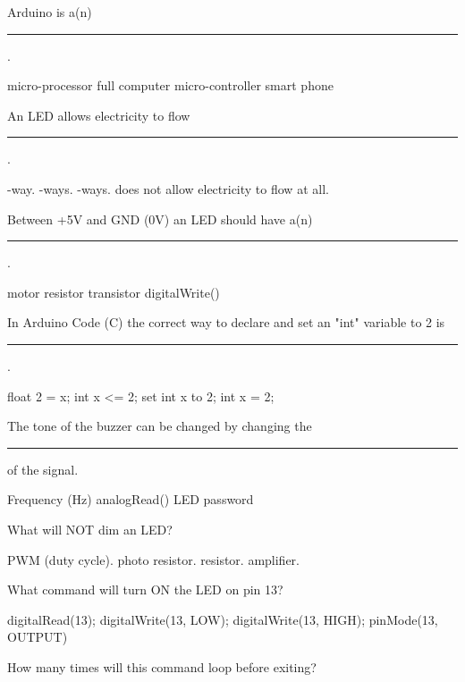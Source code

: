 \documentclass{exam}
\begin{document}
\hfill{}
\begin{center}
\end{center}
\vspace{.2in}

\begin{questions}
 
  \question Arduino is a(n) \rule{1in}{1pt}.
    \begin{choices}
      \choice micro-processor
      \choice full computer
      \choice micro-controller
      \choice smart phone
    \end{choices}
  
  \question An LED allows electricity to flow \rule{1in}{1pt}.
    \begin{choices}
      -way.
      -ways.
      -ways.
      \choice does not allow electricity to flow at all. 
    \end{choices}
  
  \question Between +5V and GND (0V) an LED should have a(n) \rule{1in}{1pt}.
    \begin{choices}
      \choice motor
      \choice resistor
      \choice transistor
      \choice digitalWrite()
    \end{choices}
  
  \question In Arduino Code (C) the correct way to declare and set an "int" variable to 2 is \rule{1in}{1pt}.
    \begin{choices}
      \choice float 2 = x;
      \choice int x <= 2; 
      \choice set int x to 2;
      \choice int x = 2;
    \end{choices}
  
  \question The tone of the buzzer can be changed by changing the \rule{1in}{1pt} of the signal. 
    \begin{choices}
      \choice Frequency (Hz)
      \choice analogRead()
      \choice LED
      \choice password
    \end{choices}
  
  \question What will NOT dim an LED? 
    \begin{choices}
      \choice PWM (duty cycle).
      \choice photo resistor.
      \choice resistor.
      \choice amplifier. 
    \end{choices}
  
  \question What command will turn ON the LED on pin 13? 
    \begin{choices}
      \choice digitalRead(13); 
      \choice digitalWrite(13, LOW);
      \choice digitalWrite(13, HIGH);
      \choice pinMode(13, OUTPUT)
    \end{choices}
  
  \question How many times will this command loop before exiting?
    \begin{choices}
    \end{choices}
  
  
  \end{questions}
\end{document}
